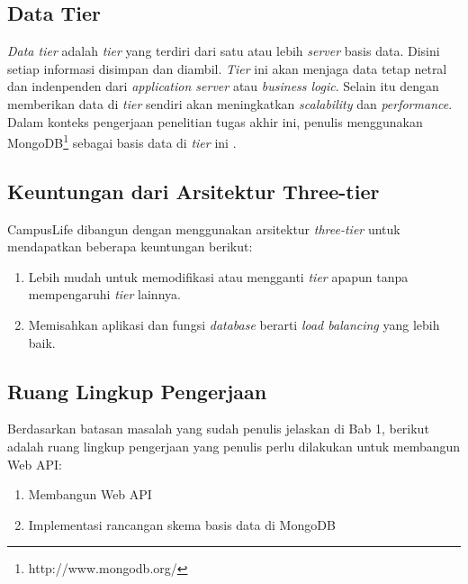 \documentclass[a4paper, 12pt, oneside]{report}
\begin{document}
\subsection{Data Tier}
\onehalfspacing \textit{Data tier} adalah \textit{tier} yang terdiri dari satu atau lebih \textit{server} basis data. Disini setiap informasi disimpan dan diambil. \textit{Tier} ini akan menjaga data tetap netral dan indenpenden dari \textit{application server} atau \textit{business logic}. Selain itu dengan memberikan data di \textit{tier} sendiri akan meningkatkan \textit{scalability} dan \textit{performance}. Dalam konteks pengerjaan penelitian tugas akhir ini, penulis menggunakan MongoDB\footnote{http://www.mongodb.org/} sebagai basis data di \textit{tier} ini \cite{multitier-architecture-wikipedia}.

\subsection{Keuntungan dari Arsitektur Three-tier}
\onehalfspacing CampusLife dibangun dengan menggunakan arsitektur \textit{three-tier} untuk mendapatkan beberapa keuntungan berikut:

\begin{enumerate}
  \item Lebih mudah untuk memodifikasi atau mengganti \textit{tier} apapun tanpa mempengaruhi \textit{tier} lainnya.
  \item Memisahkan aplikasi dan fungsi \textit{database} berarti \textit{load balancing} yang lebih baik.
\end{enumerate}

\subsection{Ruang Lingkup Pengerjaan}
\onehalfspacing Berdasarkan batasan masalah yang sudah penulis jelaskan di Bab 1, berikut adalah ruang lingkup pengerjaan yang penulis perlu dilakukan untuk membangun Web API:
\begin{enumerate}
  \item Membangun Web API
  \item Implementasi rancangan skema basis data di MongoDB
\end{enumerate}
\end{document}
